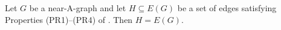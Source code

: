 \begin{lem}
Let $G$ be a near-A-graph and let $H \subseteq E(G)$ be a set of edges satisfying Properties (PR1)--(PR4) of . 
	Then $H=E(G)$.
\end{lem}

